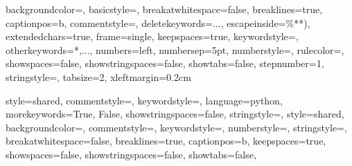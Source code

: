 {
	backgroundcolor=\color{white},   %
	basicstyle=\footnotesize\ttfamily,        %
	breakatwhitespace=false,         %
	breaklines=true,                 %
	captionpos=b,                    %
	commentstyle=\color{mygreen},    %
	deletekeywords={...},            %
	escapeinside={\%*}{*)},          %
	extendedchars=true,              %
	frame=single,                    %
	keepspaces=true,                 %
	keywordstyle=\color{blue},       %
	otherkeywords={*,...},            %
	numbers=left,                    %
	numbersep=5pt,                   %
	numberstyle=\tiny\color{mygray}, %
	rulecolor=\color{black},         %
	showspaces=false,                %
	showstringspaces=false,          %
	showtabs=false,                  %
	stepnumber=1,                    %
	stringstyle=\color{mymauve},     %
	tabsize=2,                       %
	xleftmargin=0.2cm
}

{
	style=shared,
	commentstyle=\color{Green},
	keywordstyle=\color{Cerulean},
	language=python,
	morekeywords={True, False},
	showstringspaces=false,
	stringstyle=\color{Mulberry},
}
{
	style=shared,
	backgroundcolor=\color{backcolour},   
	commentstyle=\color{codegreen},
	keywordstyle=\color{codepurple},
	numberstyle=\numberstyle,
	stringstyle=\color{codepurple},
	breakatwhitespace=false,
	breaklines=true,
	captionpos=b,
	keepspaces=true,
	showspaces=false,
	showstringspaces=false,
	showtabs=false,
}


